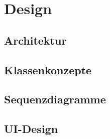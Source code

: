 \chapter{Design}
\label{pd-design}




\section{Architektur}


\section{Klassenkonzepte}


\section{Sequenzdiagramme}


\section{UI-Design}
